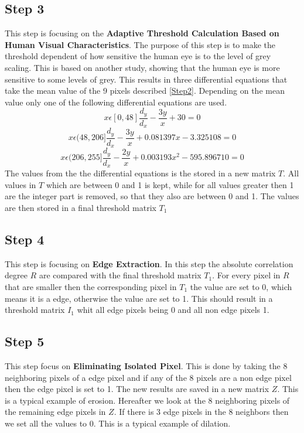 \subsection{Step 3}
\label{Step3}
This step is focusing on the \textbf{Adaptive Threshold Calculation Based on
Human Visual Characteristics}. The purpose of this step is to make the threshold dependent of how sensitive the human eye is to the level of grey scaling. This is based on another study, showing that the human eye is more sensitive to some levels of grey. This results in three differential equations that take the mean value of the 9 pixels described \autoref{Step2}. Depending on the mean value only one of the following differential equations are used.
\begin{equation}
x\epsilon[0,48]  \frac{d_y}{d_x}-\frac{3y}{x}+30=0
\end{equation}
\begin{equation}
x\epsilon(48,206]  \frac{d_y}{d_x}-\frac{3y}{x}+0.081397x-3.325108=0
\end{equation}
\begin{equation}
x\epsilon(206,255]  \frac{d_y}{d_x}-\frac{2y}{x}+0.003193x^2 -595.896710=0
\end{equation}
The values from the the differential equations is the stored in a new matrix $T$. All values in $T$ which are between 0 and 1 is kept, while for all values greater then 1 are the integer part is removed, so that they also are between 0 and 1. The values are then stored in a final threshold matrix $T_1$ 

\subsection{Step 4}
\label{Step4}
This step is focusing on \textbf{Edge Extraction}. In this step the absolute correlation degree $R$ are compared with the final threshold matrix $T_1$. For every pixel in $R$ that are smaller then the corresponding pixel in $T_1$ the value are set to 0, which means it is a edge, otherwise the value are set to 1. This should result in a threshold matrix $I_1$ whit all edge pixels being 0 and all non edge pixels 1.

\subsection{Step 5}
\label{Step5}
This step focus on \textbf{Eliminating Isolated Pixel}. This is done by taking the 8 neighboring pixels of a edge pixel and if any of the 8 pixels are a non edge pixel then the edge pixel is set to 1. The new results are saved in a new matrix $Z$. This is a typical example of erosion. Hereafter we look at the 8 neighboring pixels of the remaining edge pixels in $Z$. If there is 3 edge pixels in the 8 neighbors then we set all the values to 0. This is a typical example of dilation.

